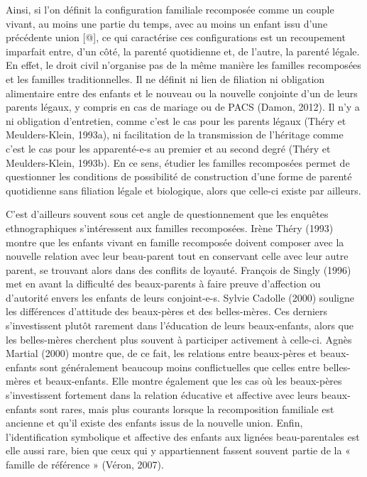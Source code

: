 \documentclass[
  12pt,
]{book}
\begin{document}
Ainsi, si l'on définit la configuration familiale recomposée comme un
couple vivant, au moins une partie du temps, avec au moins un enfant
issu d'une précédente union {[}@{]}, ce qui caractérise ces
configurations est un recoupement imparfait entre, d'un côté, la parenté
quotidienne et, de l'autre, la parenté légale. En effet, le droit civil
n'organise pas de la même manière les familles recomposées et les
familles traditionnelles. Il ne définit ni lien de filiation ni
obligation alimentaire entre des enfants et le nouveau ou la nouvelle
conjointe d'un de leurs parents légaux, y compris en cas de mariage ou
de PACS (Damon, 2012). Il n'y a ni obligation d'entretien, comme c'est
le cas pour les parents légaux (Théry et Meulders-Klein, 1993a), ni
facilitation de la transmission de l'héritage comme c'est le cas pour
les apparenté-e-s au premier et au second degré (Théry et
Meulders-Klein, 1993b). En ce sens, étudier les familles recomposées
permet de questionner les conditions de possibilité de construction
d'une forme de parenté quotidienne sans filiation légale et biologique,
alors que celle-ci existe par ailleurs.

C'est d'ailleurs souvent sous cet angle de questionnement que les
enquêtes ethnographiques s'intéressent aux familles recomposées. Irène
Théry (1993) montre que les enfants vivant en famille recomposée doivent
composer avec la nouvelle relation avec leur beau-parent tout en
conservant celle avec leur autre parent, se trouvant alors dans des
conflits de loyauté. François de Singly (1996) met en avant la
difficulté des beaux-parents à faire preuve d'affection ou d'autorité
envers les enfants de leurs conjoint-e-s. Sylvie Cadolle (2000) souligne
les différences d'attitude des beaux-pères et des belles-mères. Ces
derniers s'investissent plutôt rarement dans l'éducation de leurs
beaux-enfants, alors que les belles-mères cherchent plus souvent à
participer activement à celle-ci. Agnès Martial (2000) montre que, de ce
fait, les relations entre beaux-pères et beaux-enfants sont généralement
beaucoup moins conflictuelles que celles entre belles-mères et
beaux-enfants. Elle montre également que les cas où les beaux-pères
s'investissent fortement dans la relation éducative et affective avec
leurs beaux-enfants sont rares, mais plus courants lorsque la
recomposition familiale est ancienne et qu'il existe des enfants issus
de la nouvelle union. Enfin, l'identification symbolique et affective
des enfants aux lignées beau-parentales est elle aussi rare, bien que
ceux qui y appartiennent fassent souvent partie de la « famille de
référence » (Véron, 2007).
\end{document}
